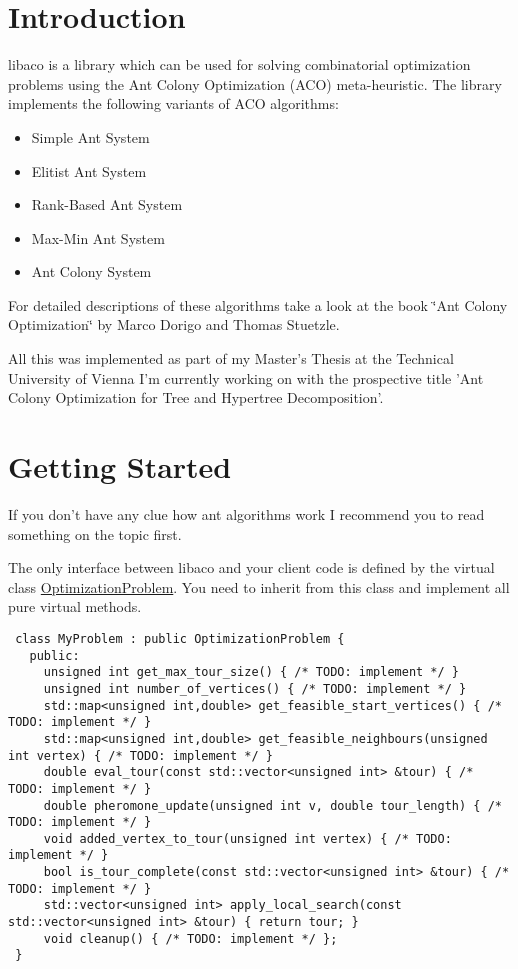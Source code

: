 \hypertarget{index_intro_sec}{}\section{Introduction}\label{index_intro_sec}
libaco is a library which can be used for solving combinatorial optimization problems using the Ant Colony Optimization (ACO) meta-heuristic. The library implements the following variants of ACO algorithms:

\begin{itemize}
\item Simple Ant System\item Elitist Ant System\item Rank-Based Ant System\item Max-Min Ant System\item Ant Colony System\end{itemize}


For detailed descriptions of these algorithms take a look at the book \char`\"{}Ant Colony Optimization\char`\"{} by Marco Dorigo and Thomas Stuetzle.

All this was implemented as part of my Master's Thesis at the Technical University of Vienna I'm currently working on with the prospective title 'Ant Colony Optimization for Tree and Hypertree Decomposition'.\hypertarget{index_getting_started_sec}{}\section{Getting Started}\label{index_getting_started_sec}
If you don't have any clue how ant algorithms work I recommend you to read something on the topic first.

The only interface between libaco and your client code is defined by the virtual class \hyperlink{classOptimizationProblem}{OptimizationProblem}. You need to inherit from this class and implement all pure virtual methods.



\begin{Code}\begin{verbatim} class MyProblem : public OptimizationProblem {
   public:
     unsigned int get_max_tour_size() { /* TODO: implement */ }
     unsigned int number_of_vertices() { /* TODO: implement */ }
     std::map<unsigned int,double> get_feasible_start_vertices() { /* TODO: implement */ }
     std::map<unsigned int,double> get_feasible_neighbours(unsigned int vertex) { /* TODO: implement */ }
     double eval_tour(const std::vector<unsigned int> &tour) { /* TODO: implement */ }
     double pheromone_update(unsigned int v, double tour_length) { /* TODO: implement */ }
     void added_vertex_to_tour(unsigned int vertex) { /* TODO: implement */ }
     bool is_tour_complete(const std::vector<unsigned int> &tour) { /* TODO: implement */ }
     std::vector<unsigned int> apply_local_search(const std::vector<unsigned int> &tour) { return tour; }
     void cleanup() { /* TODO: implement */ };
 }
\end{verbatim}
\end{Code}



